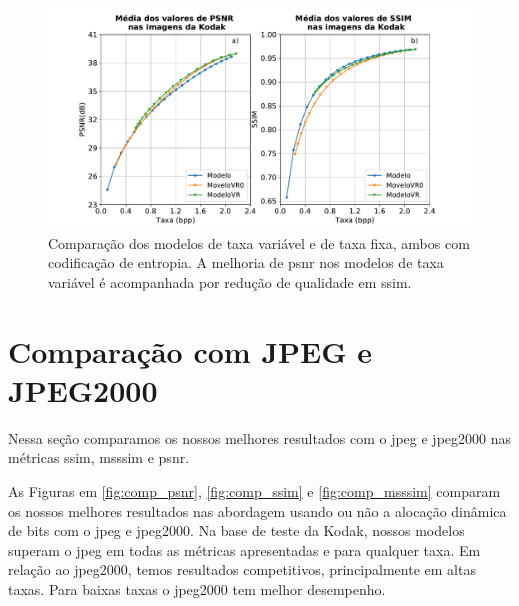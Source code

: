 \begin{figure}
	\centering
	\includegraphics[width=1.0\textwidth]{figuras/com_vr.pdf}
	\caption[Comparação dos modelos de taxa variável e taxa fixa.]{Comparação dos modelos de taxa variável e de taxa fixa, ambos com codificação de entropia. A melhoria de \acrshort{psnr} nos modelos de taxa variável é acompanhada por redução de qualidade em \acrshort{ssim}.}  	
	\label{fig:comp_vr}
\end{figure}

\section{Comparação com JPEG e JPEG2000}

Nessa seção comparamos os nossos melhores resultados com o \acrshort{jpeg} e \acrshort{jpeg}2000 nas métricas \acrshort{ssim}, \acrshort{msssim} e \acrshort{psnr}. 


As Figuras em \ref{fig:comp_psnr}, \ref{fig:comp_ssim} e \ref{fig:comp_msssim} comparam os nossos melhores resultados nas abordagem usando ou não a alocação dinâmica de bits com o \acrshort{jpeg} e \acrshort{jpeg}2000. Na base de teste da Kodak, nossos modelos superam o \acrshort{jpeg} em todas as métricas apresentadas e para qualquer taxa. Em relação ao \acrshort{jpeg}2000, temos resultados competitivos, principalmente em altas taxas. Para baixas taxas o \acrshort{jpeg}2000 tem melhor desempenho.  



